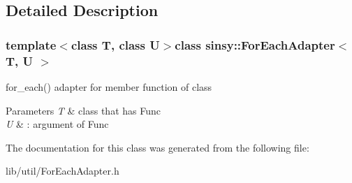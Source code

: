 \subsection{\-Detailed \-Description}
\subsubsection*{template$<$class T, class U$>$class sinsy\-::\-For\-Each\-Adapter$<$ T, U $>$}

for\-\_\-each() adapter for member function of class


\begin{DoxyParams}{\-Parameters}
{\em \-T} & class that has \-Func \\
\hline
{\em \-U} & \-: argument of \-Func \\
\hline
\end{DoxyParams}


\-The documentation for this class was generated from the following file\-:\begin{DoxyCompactItemize}
\item 
lib/util/\-For\-Each\-Adapter.\-h\end{DoxyCompactItemize}
